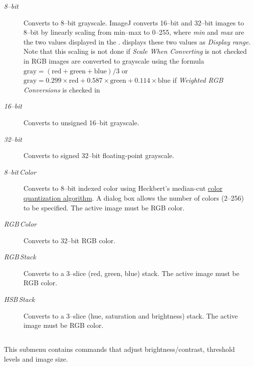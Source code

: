 \begin{description}
\item [{\emph{8--bit}}] Converts to 8--bit grayscale. ImageJ converts 16--bit
and 32--bit images to 8--bit by linearly scaling from min--max to
0--255, where \emph{min} and \emph{max} are the two values displayed
in the .
 displays
these two values as \emph{Display range}. Note
that this scaling is not done if \emph{Scale When Converting} is not
checked in 
RGB images are converted to grayscale using the formula $\text{gray}=(\text{red}+\text{green}+\text{blue})/3$
or $\text{gray}=0.299\times\text{red}+0.587\times\text{green}+0.114\times\text{blue}$
if \emph{Weighted RGB Conversions} is checked in 
\item [{\emph{16--bit}}] Converts to unsigned 16--bit grayscale.
\item [{\emph{32--bit}}] Converts to signed 32--bit floating-point grayscale.
\item [{\emph{8--bit\,Color}}] Converts to 8--bit indexed color using
Heckbert's median-cut \href{http://en.wikipedia.org/wiki/Color_quantization}{color quantization algorithm}.
A dialog box allows the number of colors (2--256) to be specified.
The active image must be RGB color.
\item [{\emph{RGB\,Color}}] Converts to 32--bit RGB color.
\item [{\emph{RGB\,Stack}}] Converts to a 3--slice (red, green,
blue) stack. The active image must be RGB color. 
\item [{\emph{HSB\,Stack}}] Converts to a 3--slice (hue, saturation
and brightness) stack. The active image must be RGB color.
\end{description}

\subsection{\protect{}\label{sub:Adjust}}

This submenu contains commands that adjust brightness/contrast, threshold
levels and image size.


